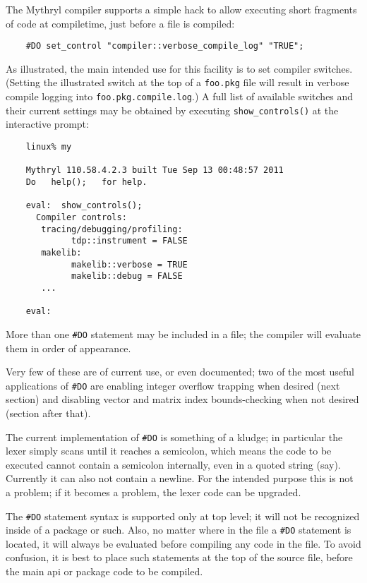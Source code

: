The Mythryl compiler supports a simple hack to allow executing short 
fragments of code at compiletime, just before a file is compiled: 

\begin{verbatim}
    #DO set_control "compiler::verbose_compile_log" "TRUE";
\end{verbatim}

As illustrated, the main intended use for this facility is to set 
compiler switches.  (Setting the illustrated switch at the top of 
a {\tt foo.pkg} file will result in verbose compile logging into 
{\tt foo.pkg.compile.log}.)  A full list of available switches and their 
current settings may be obtained by executing {\tt show\_controls()} 
at the interactive prompt:

\begin{verbatim}
    linux% my

    Mythryl 110.58.4.2.3 built Tue Sep 13 00:48:57 2011
    Do   help();   for help.

    eval:  show_controls();
      Compiler controls:
       tracing/debugging/profiling:
             tdp::instrument = FALSE
       makelib:
             makelib::verbose = TRUE
             makelib::debug = FALSE
       ...

    eval:  
\end{verbatim}

More than one {\tt #DO} statement may be included in a file;  the 
compiler will evaluate them in order of appearance.

Very few of these are of current use, or even documented;  two of the 
most useful applications of {\tt #DO} are enabling integer overflow 
trapping when desired (next section) and 
disabling vector and matrix index bounds-checking when not desired 
(section after that).

The current implementation of {\tt #DO} is something of a kludge;  in 
particular the lexer simply scans until it reaches a semicolon, which 
means the code to be executed cannot contain a semicolon internally, 
even in a quoted string (say).  Currently it can also not contain a newline.
For the intended purpose this is not  a problem;  if it becomes a problem,
the lexer code can be upgraded. 

The {\tt #DO} statement syntax is supported only at top level;  it 
will not be recognized inside of a package or such.  Also, no matter 
where in the file a {\tt #DO} statement is located, it will always 
be evaluated before compiling any code in the file.  To avoid confusion, 
it is best to place such statements at the top of the source file, 
before the main api or package code to be compiled.

